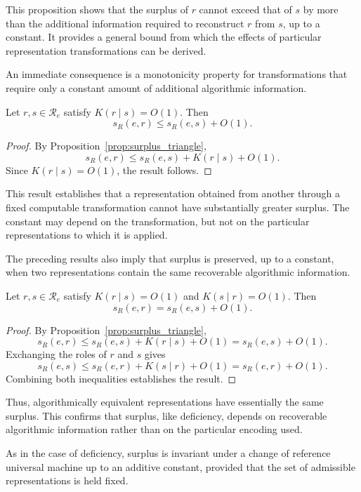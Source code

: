 This proposition shows that the surplus of $r$ cannot exceed that of $s$ by more than the additional information required to reconstruct $r$ from $s$, up to a constant. It provides a general bound from which the effects of particular representation transformations can be derived.

An immediate consequence is a monotonicity property for transformations that require only a constant amount of additional algorithmic information.

\begin{corollary}
\label{cor:surplus_monotonicity}
Let $r,s\in\mathcal R_e$ satisfy $K(r\mid s) = O(1)$. Then
\[
s_R(e,r)\le s_R(e,s)+O(1).
\]
\end{corollary}
\begin{proof}
By Proposition~\ref{prop:surplus_triangle},
\[
s_R(e,r) \le s_R(e,s) + K(r\mid s) + O(1).
\]
Since $K(r\mid s)=O(1)$, the result follows.
\end{proof}

This result establishes that a representation obtained from another through a fixed computable transformation cannot have substantially greater surplus. The constant may depend on the transformation, but not on the particular representations to which it is applied.

The preceding results also imply that surplus is preserved, up to a constant, when two representations contain the same recoverable algorithmic information.

\begin{proposition}
\label{prop:surplus_algorithmic_equivalence}
Let $r,s\in\mathcal R_e$ satisfy $K(r\mid s)=O(1)$ and $K(s\mid r)=O(1)$. Then
\[
s_R(e,r)=s_R(e,s)+O(1).
\]
\end{proposition}
\begin{proof}
By Proposition~\ref{prop:surplus_triangle},
\[
s_R(e,r) \le s_R(e,s) + K(r\mid s) + O(1) = s_R(e,s) + O(1).
\]
Exchanging the roles of $r$ and $s$ gives
\[
s_R(e,s) \le s_R(e,r) + K(s\mid r) + O(1) = s_R(e,r) + O(1).
\]
Combining both inequalities establishes the result.
\end{proof}

Thus, algorithmically equivalent representations have essentially the same surplus. This confirms that surplus,
like deficiency, depends on recoverable algorithmic information rather than on the particular encoding used.

As in the case of deficiency, surplus is invariant under a change of reference universal machine up to an additive constant, provided that the set of admissible representations is held fixed.

